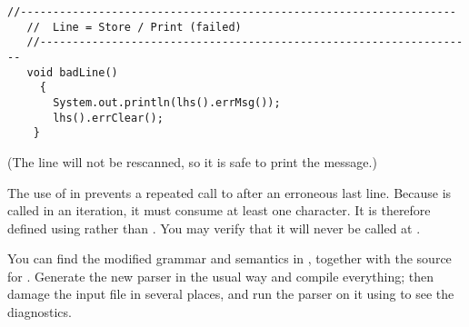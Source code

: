 \small
\begin{Verbatim}[frame=single,framesep=2mm,samepage=true,xleftmargin=15mm,xrightmargin=15mm,baselinestretch=0.8]
   //-------------------------------------------------------------------
   //  Line = Store / Print (failed)
   //-------------------------------------------------------------------
   void badLine()
     {
       System.out.println(lhs().errMsg());
       lhs().errClear();
    }
\end{Verbatim}
\normalsize

(The line will not be rescanned, so it is safe to print the message.)

The use of \tx{++} in  prevents a repeated call to 
after an erroneous last line.
Because  is called in an iteration, 
it must consume at least one character.
It is therefore defined using \tx{++} rather than \tx{*+}.
You may verify that it will never be called at .

You can find the modified grammar and semantics in ,
together with the source for .
Generate the new parser in the usual way and compile everything;
then damage the input file in several places,
and run the parser on it using 
to see the diagnostics.
